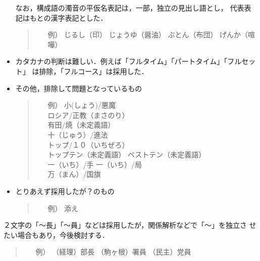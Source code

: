 \documentclass[a4j,titlepage]{jarticle}
\begin{document}
\begin{itemize}
  なお，構成語の濁音の平仮名表記は，一部，独立の見出し語とし，
  代表表記はもとの漢字表記とした．
       \begin{quote}
	\begin{itemize}
	 \item[例）] じるし（印） じょうゆ（醤油） ぶとん（布団） げんか（喧嘩）\\
	\end{itemize}
       \end{quote}

 \item カタカナの判断は難しい．例えば「フルタイム」「パートタイム」「フルセット」
  は排除，「フルコース」は採用した．

 \item その他，排除して問題となっているもの
       \begin{quote}
	\begin{itemize}
	 \item[例）] 小(しょう)/悪魔 \\
		   ロシア/正教（まさのり） \\
		   有田/焼（未定義語） \\
		   十（じゅう）/進法 \\
		   トップ/１０（いちぜろ） \\
		   トップテン（未定義語） ベストテン（未定義語） \\
		   一（いち）/手 一（いち）/局 \\
		   万（まん）/国旗
	\end{itemize}
       \end{quote}

 \item とりあえず採用したが？のもの
       \begin{quote}
	\begin{itemize}
	 \item[例）] 添え
	\end{itemize}
       \end{quote}
\end{itemize}

２文字の「〜長」「〜員」などは採用したが，関係解析などで「〜」を独立さ
せたい場合もあり，今後検討する．
       \begin{quote}
	\begin{itemize}
	 \item[例）] （経理）部長 （駒ヶ根）署員 （民主）党員
	\end{itemize}
       \end{quote}
\end{document}
